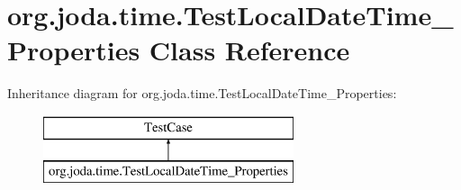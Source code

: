 \hypertarget{classorg_1_1joda_1_1time_1_1_test_local_date_time___properties}{\section{org.\-joda.\-time.\-Test\-Local\-Date\-Time\-\_\-\-Properties Class Reference}
\label{classorg_1_1joda_1_1time_1_1_test_local_date_time___properties}
}
Inheritance diagram for org.\-joda.\-time.\-Test\-Local\-Date\-Time\-\_\-\-Properties\-:\begin{figure}[H]
\begin{center}
\leavevmode
\includegraphics[height=2.000000cm]{classorg_1_1joda_1_1time_1_1_test_local_date_time___properties}
\end{center}
\end{figure}
